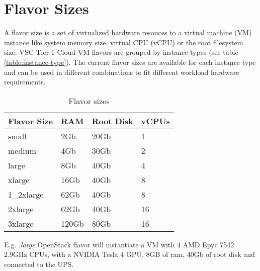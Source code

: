 \section{Flavor Sizes}\label{sec:flavor-sizes}
A flavor size is a set of virtualized hardware resouces to a virtual machine (VM) instance like system memory size, virtual CPU (vCPU) or the root filesystem size.
VSC Tier-1 Cloud VM flavors are grouped by instance types (see table \ref{table:instance-type}). The current flavor sizes are available for each instance type and can be used in different combinations to fit different workload hardware requirements.

\begin{table}[h!]
\centering
\begin{tabular}{ |p{3cm}|p{3cm}|p{3cm}|p{3cm}| }
  \hline
  \rowcolor{lightgray} \textbf{Flavor Size} & \textbf{RAM} & \textbf{Root Disk} & \textbf{vCPUs} \\
  \hline
  small & 2Gb & 20Gb & 1 \\
  \hline
  medium & 4Gb & 30Gb & 2 \\
  \hline
  large & 8Gb & 40Gb & 4 \\
  \hline
  xlarge & 16Gb & 40Gb & 8 \\
  \hline
  1\_2xlarge & 62Gb & 40Gb & 8 \\
  \hline
  2xlarge & 62Gb & 40Gb & 16 \\
  \hline
  3xlarge & 120Gb & 80Gb & 16 \\
  \hline
\end{tabular}
\caption{Flavor sizes}
\label{table:flavor-size}
\end{table}

E.g. .\emph{large} OpenStack flavor will instantiate a VM with 4 AMD Epyc 7542 2.9GHz CPUs, with a NVIDIA Tesla 4 GPU, 8GB of ram, 40Gb of root disk and connected to the UPS.

